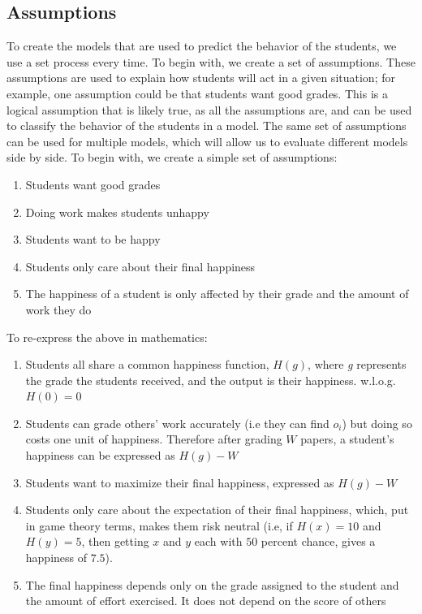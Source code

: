 \documentclass[12pt, Arial]{article}
\begin{document}
\subsection{Assumptions}
To create the models that are used to predict the behavior of the students, we use a set process every time. To begin with, we create a set of assumptions. These assumptions are used to explain how students will act in a given situation; for example, one assumption could be that students want good grades. This is a logical assumption that is likely true, as all the assumptions are, and can be used to classify the behavior of the students in a model. The same set of assumptions can be used for multiple models, which will allow us to evaluate different models side by side. To begin with, we create a simple set of assumptions:
\begin{enumerate}[itemsep=0pt, parsep=0pt]
	\item Students want good grades
 	\item Doing work makes students unhappy
  	\item Students want to be happy
 	\item Students only care about their final happiness
  	\item The happiness of a student is only affected by their grade and the amount of work they do
\end{enumerate}
To re-express the above in mathematics:
\begin{enumerate}[itemsep=0pt, parsep=0pt]
  \item Students all share a common happiness function, $H(g)$, where \emph{g} represents the grade the students received, and the output is their happiness. w.l.o.g. $H(0)=0$
  \item Students can grade others' work accurately (i.e they can find $o_i$) but doing so costs one unit of happiness. Therefore after grading $W$ papers, a student's happiness can be expressed as $H(g)-W$
  \item Students want to maximize their final happiness, expressed as $H(g)-W$
  \item Students only care about the expectation of their final happiness, which, put in game theory terms, makes them risk neutral (i.e, if $H(x)=10$ and $H(y)=5$, then getting $x$ and $y$ each with $50$ percent chance, gives a happiness of $7.5$).
  \item The final happiness depends only on the grade assigned to the student and the amount of effort exercised. It does not depend on the score of others
\end{enumerate}
\end{document}
